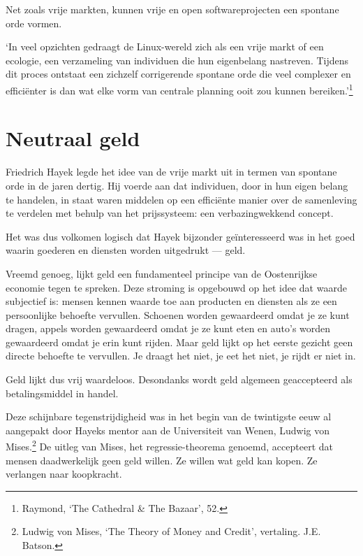 \documentclass[smalldemyvopaper,11pt,twoside,onecolumn,openright,extrafontsizes,hidelinks]{memoir}
\begin{document}
Net zoals vrije markten, kunnen vrije en open softwareprojecten een
spontane orde vormen.

`In veel opzichten gedraagt de Linux-wereld zich als een vrije markt of
een ecologie, een verzameling van individuen die hun eigenbelang
nastreven. Tijdens dit proces ontstaat een zichzelf corrigerende
spontane orde die veel complexer en efficiënter is dan wat elke vorm van
centrale planning ooit zou kunnen bereiken.'\footnote{\hspace{0pt}Raymond,
  `The Cathedral \& The Bazaar', 52.}

\chapter{Neutraal geld}\label{neutraal-geld}

Friedrich Hayek legde het idee van de vrije markt uit in termen van
spontane orde in de jaren dertig. Hij voerde aan dat individuen, door in
hun eigen belang te handelen, in staat waren middelen op een efficiënte
manier over de samenleving te verdelen met behulp van het prijssysteem:
een verbazingwekkend concept.

Het was dus volkomen logisch dat Hayek bijzonder geïnteresseerd was in
het goed waarin goederen en diensten worden uitgedrukt --- geld.

Vreemd genoeg, lijkt geld een fundamenteel principe van de Oostenrijkse
economie tegen te spreken. Deze stroming is opgebouwd op het idee dat
waarde subjectief is: mensen kennen waarde toe aan producten en diensten
als ze een persoonlijke behoefte vervullen. Schoenen worden gewaardeerd
omdat je ze kunt dragen, appels worden gewaardeerd omdat je ze kunt eten
en auto's worden gewaardeerd omdat je erin kunt rijden. Maar geld lijkt
op het eerste gezicht geen directe behoefte te vervullen. Je draagt het
niet, je eet het niet, je rijdt er niet in.

Geld lijkt dus vrij waardeloos. Desondanks wordt geld algemeen
geaccepteerd als betalingsmiddel in handel.

Deze schijnbare tegenstrijdigheid was in het begin van de twintigste
eeuw al aangepakt door Hayeks mentor aan de Universiteit van Wenen,
Ludwig von Mises.\footnote{\hspace{0pt}Ludwig von Mises, `The Theory of
  Money and Credit', vertaling. J.E. Batson.} De uitleg van Mises, het
regressie-theorema genoemd, accepteert dat mensen daadwerkelijk geen
geld willen. Ze willen wat geld kan kopen. Ze verlangen naar koopkracht.
\end{document}
